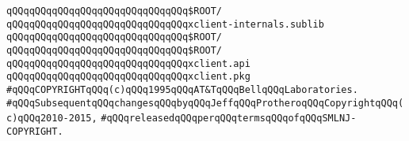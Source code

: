 \verb|qQQqqQQqqQQqqQQqqQQqqQQqqQQqqQQq$ROOT/|\newline
\verb|qQQqqQQqqQQqqQQqqQQqqQQqqQQqqQQqxclient-internals.sublib|\newline
\newline
\verb|qQQqqQQqqQQqqQQqqQQqqQQqqQQqqQQq$ROOT/|\newline
\verb|qQQqqQQqqQQqqQQqqQQqqQQqqQQqqQQq$ROOT/|\newline
\newline
\verb|qQQqqQQqqQQqqQQqqQQqqQQqqQQqqQQqxclient.api|\newline
\verb|qQQqqQQqqQQqqQQqqQQqqQQqqQQqqQQqxclient.pkg|\newline
\newline
\newline
\newline
\verb|#qQQqCOPYRIGHTqQQq(c)qQQq1995qQQqAT&TqQQqBellqQQqLaboratories.|\newline
\verb|#qQQqSubsequentqQQqchangesqQQqbyqQQqJeffqQQqProtheroqQQqCopyrightqQQq(c)qQQq2010-2015,|\newline
\verb|#qQQqreleasedqQQqperqQQqtermsqQQqofqQQqSMLNJ-COPYRIGHT.|\newline

